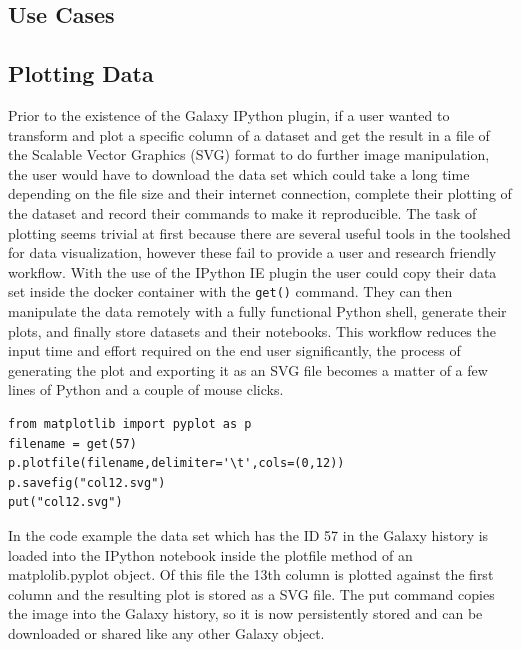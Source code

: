 \documentclass{bioinfo}
\begin{document}
\begin{methods}
\section{Use Cases}
\subsection{Plotting Data}
Prior to the existence of the Galaxy IPython plugin, if a user wanted to transform and plot a specific column of a dataset and
get the result in a file of the Scalable Vector Graphics (SVG) format to do further image manipulation,
the user would have to download the data set which could take a long time depending on the file size and their internet
connection, complete their plotting of the dataset and record their commands to make it reproducible.
The task of plotting seems trivial at first because there are several useful tools in the toolshed for data visualization,
however these fail to provide a user and research friendly workflow. With the use of the IPython IE plugin the user
could copy their data set inside the docker container with the \texttt{get()} command. They can then manipulate the
data remotely with a fully functional Python shell, generate their plots, and finally store datasets and their notebooks.
This workflow reduces the input time and effort required on the end user significantly, the process of generating the plot
and exporting it as an SVG file becomes a matter of a few lines of Python and a couple of mouse clicks.

\begin{lstlisting}[frame=single]
from matplotlib import pyplot as p
filename = get(57)
p.plotfile(filename,delimiter='\t',cols=(0,12))
p.savefig("col12.svg")
put("col12.svg")
\end{lstlisting}
In the code example the data set which has the ID 57 in the Galaxy history is loaded into the IPython notebook inside the
plotfile method of an matplolib.pyplot object. Of this file the 13th column is plotted against the first column and the
resulting plot is stored as a SVG file. The put command copies the image into the Galaxy history, so it is now persistently
stored and can be downloaded or shared like any other Galaxy object.


\end{methods}
\end{document}
